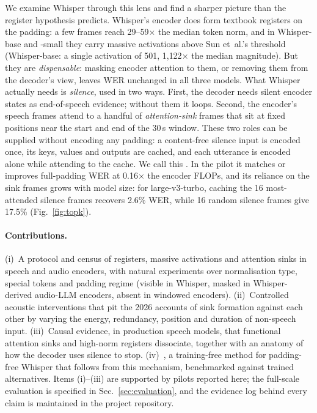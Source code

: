 We examine Whisper through this lens and find a sharper picture than the register hypothesis predicts. Whisper's encoder does form textbook registers on the padding: a few frames reach 29--59$\times$ the median token norm, and in Whisper-base and -small they carry massive activations above Sun et~al.'s threshold~\cite{sun2024massive} (Whisper-base: a single activation of 501, 1{,}122$\times$ the median magnitude). But they are \emph{dispensable}: masking encoder attention to them, or removing them from the decoder's view, leaves WER unchanged in all three models. What Whisper actually needs is \emph{silence}, used in two ways. First, the decoder needs silent encoder states as end-of-speech evidence; without them it loops. Second, the encoder's speech frames attend to a handful of \emph{attention-sink} frames that sit at fixed positions near the start and end of the 30\,s window. These two roles can be supplied without encoding any padding: a content-free silence input is encoded once, its keys, values and outputs are cached, and each utterance is encoded alone while attending to the cache. We call this \method{}. In the pilot it matches or improves full-padding WER at 0.16$\times$ the encoder FLOPs, and its reliance on the sink frames grows with model size: for large-v3-turbo, caching the 16 most-attended silence frames recovers 2.6\% WER, while 16 random silence frames give 17.5\% (Fig.~\ref{fig:topk}).

\paragraph{Contributions.}
(i)~A protocol and census of registers, massive activations and attention sinks in speech and audio encoders, with natural experiments over normalisation type, special tokens and padding regime (visible in Whisper, masked in Whisper-derived audio-LLM encoders, absent in windowed encoders). (ii)~Controlled acoustic interventions that pit the 2026 accounts of sink formation against each other by varying the energy, redundancy, position and duration of non-speech input. (iii)~Causal evidence, in production speech models, that functional attention sinks and high-norm registers dissociate, together with an anatomy of how the decoder uses silence to stop. (iv)~\method{}, a training-free method for padding-free Whisper that follows from this mechanism, benchmarked against trained alternatives. Items (i)--(iii) are supported by pilots reported here; the full-scale evaluation is specified in Sec.~\ref{sec:evaluation}, and the evidence log behind every claim is maintained in the project repository.
